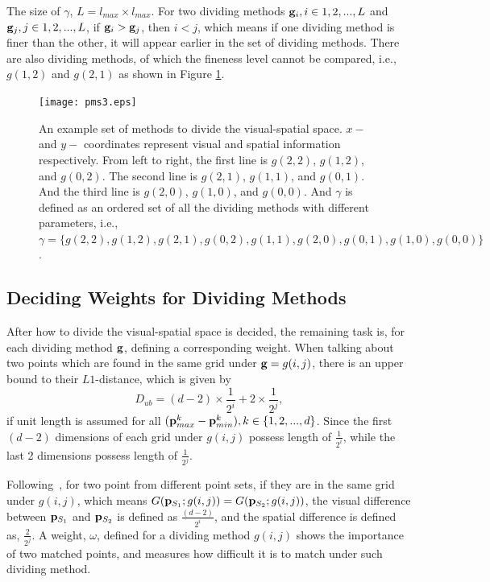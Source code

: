 The size of $\gamma$, $L=l_{max} \times l_{max}$. For two dividing methods ${\bf g}_i,i \in {1,2,...,L}$ and ${\bf g}_j,j \in {1,2,...,L}$, if ${\bf g}_i>{\bf g}_j$, then $i<j$, which means if one dividing method is finer than the other, it will appear earlier in the set of dividing methods. There are also dividing methods, of which the fineness level cannot be compared, i.e., $g(1,2)$ and $g(2,1)$ as shown in Figure \ref{fig:p3}.


\begin{figure}
\centering
\texttt{[image: pms3.eps]}
\caption[Visual-spatial space dividing.]{An example set of methods to divide the visual-spatial space. $x-$ and $y-$ coordinates represent visual and spatial information respectively. From left to right, the first line is $g(2,2)$, $g(1,2)$, and $g(0,2)$. The second line is $g(2,1)$, $g(1,1)$, and $g(0,1)$. And the third line is $g(2,0)$, $g(1,0)$, and $g(0,0)$. And $\gamma$ is defined as an ordered set of all the dividing methods with different parameters, i.e., $\gamma=\{g(2,2),g(1,2),g(2,1),g(0,2),g(1,1),g(2,0),g(0,1),g(1,0),g(0,0)\}$.}
\label{fig:p3}
\end{figure}



\subsection{Deciding Weights for Dividing Methods}
After how to divide the visual-spatial space is decided, the remaining task is, for each dividing method $\bf g$, defining a corresponding weight.
When talking about two points which are found in the same grid under ${\bf g}=g(i,j)$, there is an upper bound to their $L1$-distance, which is given by
\[D_{ub}=  {(d-2)\times \frac 1 {2^i} +2\times \frac 1 {2^j} } ,
\]
 if unit length is assumed for all $({\bf p}_{max}^k - {\bf p}_{min}^k ),k \in \{1,2,...,d\}$. Since the first $(d-2)$ dimensions of each grid under $g(i,j)$ possess length of $\frac 1 {2^i}$, while the last 2 dimensions possess length of  $\frac 1 {2^j}$.



Following~\citep{pmk}, for two point from different point sets, if they are in the same grid under $g(i,j)$, which means $G({\bf p}_{S_1};g(i,j))=G({\bf p}_{S_2};g(i,j))$, the visual difference between ${\bf p}_{S_1}$ and ${\bf p}_{S_2}$  is defined as $ \frac {(d-2)}{2^i}$, and the spatial difference is defined as, $ \frac 2 {2^j}$.
A weight, $\omega$, defined for a dividing method $g(i,j)$ shows the importance of two matched points, and measures how difficult it is to match under such dividing method.

